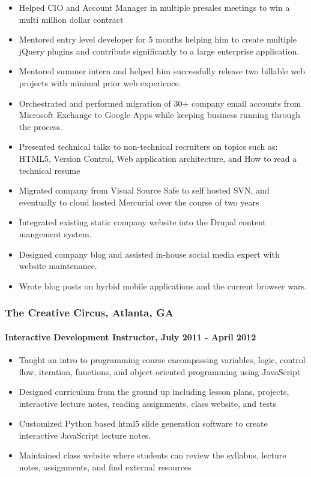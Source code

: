 \begin{itemize}
\item
  Helped CIO and Account Manager in multiple presales meetings to win a
  multi million dollar contract
\item
  Mentored entry level developer for 5 months helping him to create
  multiple jQuery plugins and contribute significantly to a large
  enterprise application.
\item
  Mentored summer intern and helped him successfully release two
  billable web projects with minimal prior web experience.
\item
  Orchestrated and performed migration of 30+ company email accounts
  from Microsoft Exchange to Google Apps while keeping business running
  through the process.
\item
  Presented technical talks to non-technical recruiters on topics such
  as: HTML5, Version Control, Web application architecture, and How to
  read a technical resume
\item
  Migrated company from Visual Source Safe to self hosted SVN, and
  eventually to cloud hosted Mercurial over the course of two years
\item
  Integrated existing static company website into the Drupal content
  mangement system.
\item
  Designed company blog and assisted in-house social media expert with
  website maintenance.
\item
  Wrote blog posts on hyrbid mobile applications and the current browser
  wars.
\end{itemize}
\subsubsection{The Creative Circus, Atlanta, GA}

\paragraph{Interactive Development Instructor, July 2011 - April 2012}

\begin{itemize}
\item
  Taught an intro to programming course encompassing variables, logic,
  control flow, iteration, functions, and object oriented programming
  using JavaScript
\item
  Designed curriculum from the ground up including lesson plans,
  projects, interactive lecture notes, reading assignments, class
  website, and tests
\item
  Customized Python based html5 slide generation software to create
  interactive JavaScript lecture notes.
\item
  Maintained class website where students can review the syllabus,
  lecture notes, assignments, and find external resources
\end{itemize}
